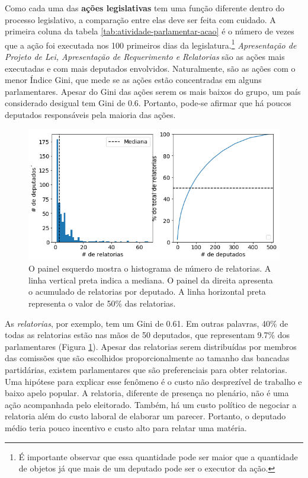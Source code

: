 \documentclass[12pt,a4paper]{article}
\begin{document}
Como cada uma das \textbf{ações legislativas} tem uma função diferente dentro do processo legislativo, a comparação entre elas deve ser feita com cuidado. A primeira coluna da tabela \ref{tab:atividade-parlamentar-acao} é o número de vezes que a ação foi executada nos 100 primeiros dias da legislatura.\footnote{É importante observar que essa quantidade pode ser maior que a quantidade de objetos já que mais de um deputado pode ser o executor da ação.} \textit{Apresentação de Projeto de Lei, Apresentação de Requerimento e Relatorias} são as ações mais executadas e com mais deputados envolvidos. Naturalmente, são as ações com o menor Índice Gini, que mede se as ações estão concentradas em alguns parlamentares. Apesar do Gini das ações serem os mais baixos do grupo, um país considerado desigual tem Gini de 0.6. Portanto, pode-se afirmar que há poucos deputados responsáveis pela maioria das ações.

\begin{figure}[H]
\centering
\includegraphics[width=1.0\textwidth]{graficos/camara/atividade/plot_relatorias_deputados.png}
\caption{O painel esquerdo mostra o histograma de número de relatorias. A linha vertical preta indica a mediana. O painel da direita apresenta o acumulado de relatorias por deputado. A linha horizontal preta representa o valor de 50\% das relatorias. }
\label{fig:atividade-parlamentar-relatorias-deputados}
\end{figure} 

As \textit{relatorias}, por exemplo, tem um Gini de 0.61. Em outras palavras, 40\% de todas as relatorias estão nas mãos de 50 deputados, que representam 9.7\% dos parlamentares (Figura \ref{fig:atividade-parlamentar-relatorias-deputados}). Apesar das relatorias serem distribuídas por membros das comissões que são escolhidos proporcionalmente ao tamanho das bancadas partidárias, existem parlamentares que são preferenciais para obter relatorias. Uma hipótese para explicar esse fenômeno é o custo não desprezível de trabalho e baixo apelo popular. A relatoria, diferente de presença no plenário, não é uma ação acompanhada pelo eleitorado. Também, há um custo político de negociar a relatoria além do custo laboral de elaborar um parecer. Portanto, o deputado médio teria pouco incentivo e custo alto para relatar uma matéria. 
\end{document}
